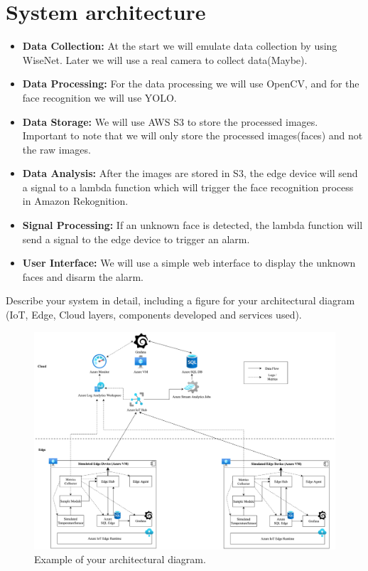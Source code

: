 \documentclass[conference]{IEEEtran}
\begin{document}
\section{System architecture}
\begin{itemize}
    \item \textbf{Data Collection:} At the start we will emulate data collection by using WiseNet. Later we will use a real camera to collect data(Maybe).
    \item \textbf{Data Processing:} For the data processing we will use OpenCV, and for the face recognition we will use YOLO.
    \item \textbf{Data Storage:} We will use AWS S3 to store the processed images. Important to note that we will only store the processed images(faces) and not the raw images.
    \item \textbf{Data Analysis:} After the images are stored in S3, the edge device will send a signal to a lambda function which will trigger the face recognition process in Amazon Rekognition.
    \item \textbf{Signal Processing:} If an unknown face is detected, the lambda function will send a signal to the edge device to trigger an alarm.  
    \item \textbf{User Interface:} We will use a simple web interface to display the unknown faces and disarm the alarm.
\end{itemize}
Describe your system in detail, including a figure for your architectural diagram (IoT, Edge, Cloud layers, components developed and services used).

\begin{figure}[h!]
    \centering
    \includegraphics[width=1\linewidth]{image.png}
    \caption{Example of your architectural diagram.}
    \label{fig:enter-label}
\end{figure}
\end{document}
